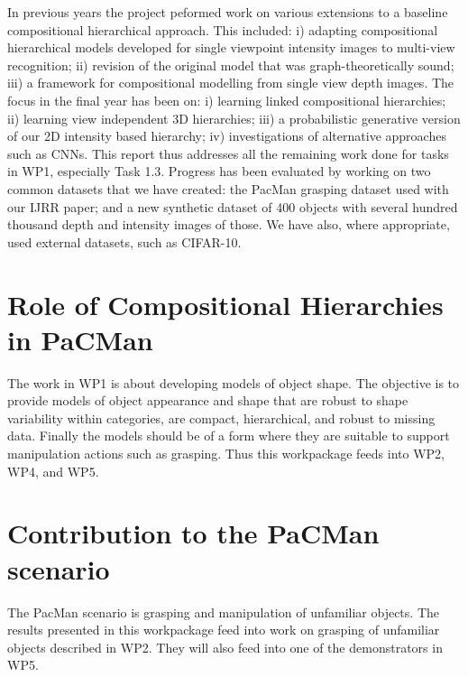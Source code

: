 \documentclass[a4paper,11pt,pdf]{../templates/pacmanreport}
\begin{document}
In previous years the project peformed work on various extensions to a baseline compositional hierarchical approach. This included: i) adapting compositional hierarchical models developed for single viewpoint intensity images to multi-view recognition; ii) revision of the original model that was graph-theoretically sound; iii) a framework for compositional modelling from single view depth images. The focus in the final year has been on: i) learning linked compositional hierarchies; ii) learning view independent 3D hierarchies; iii) a probabilistic generative version of our 2D intensity based hierarchy; iv) investigations of alternative approaches such as CNNs. This report thus addresses all the remaining work done for tasks in WP1, especially Task 1.3. Progress has been evaluated by working on two common datasets that we have created: the PacMan grasping dataset used with our IJRR paper; and a new synthetic dataset of 400 objects with several hundred thousand depth and intensity images of those. We have also, where appropriate, used external datasets, such as CIFAR-10.

\section*{Role of Compositional Hierarchies in PaCMan}

The work in WP1 is about developing models of object shape. The objective is to provide models of object appearance and shape that are robust to shape variability within categories, are compact, hierarchical, and robust to missing data. Finally the models should be of a form where they are suitable to support manipulation actions such as grasping. Thus this workpackage feeds into WP2, WP4, and WP5.

\section*{Contribution to the PaCMan scenario}

The PacMan scenario is grasping and manipulation of unfamiliar objects. The results presented in this workpackage feed into work on grasping of unfamiliar objects described in WP2. They will also feed into one of the demonstrators in WP5.
\end{document}
